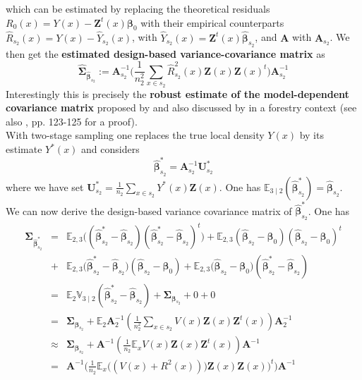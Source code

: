 \documentclass[a4paper,12pt,leqno, titlepage]{article}
\newcommand{\EX}{\mathbb{E}}
\newcommand{\VAR}{\mathbb{V}}
\begin{document}
which can be estimated by replacing the theoretical residuals $R_0(x)=Y(x)-\pmb{Z}^t(x)\pmb{\beta}_0$
with their empirical counterparts
$\hat{R}_{s_2}(x)=Y(x)-\hat{Y}_{s_2}(x)$, with $\hat{Y}_{s_2}(x)=\pmb{Z}^t(x)\hat{\pmb{\beta}}_{s_2}$, and $\pmb{A}$ with $\pmb{A}_{s_2}$. We then get the \textbf{estimated design-based
variance-covariance matrix} as
\begin{equation}\label{estvarmatrix}
\hat{\pmb{\Sigma}}_{\hat{\pmb{\beta}}_{s_2}}:=\pmb{A}_{s_2}^{-1}
\Big(\frac{1}{n_2^2}\sum_{x\in{s_2}}\hat{R}_{s_2}^2(x)\pmb{Z}(x)\pmb{Z}(x)^t\Big)\pmb{A}_{s_2}^{-1}
\end{equation}
Interestingly this is precisely the \textbf{robust estimate of the model-dependent covariance matrix} proposed by \cite{huber1} and also discussed by \cite{gregoire2} in a forestry context (see also \cite{mandallaz}, pp. 123-125 for a proof).\\
With two-stage sampling one replaces the true local density $Y(x)$ by its estimate $Y^*(x)$ and considers
\begin{equation}\label{beta2star}
\hat{\pmb{\beta}}^*_{s_2}=\pmb{A}_{s_2}^{-1}\pmb{U}^*_{s_2}
\end{equation}
where we have set $\pmb{U}^*_{s_2}=\frac{1}{n_2}\sum_{x\in{s_2}}Y^*(x)\pmb{Z}(x)$. One has $\EX_{3\mid 2}(\hat{\pmb{\beta}}^*_{s_2})=\hat{\pmb{\beta}}_{s_2}$.\\
 \noindent
We can now derive the design-based variance covariance matrix of $\hat{\pmb{\beta}}^*_{s_2}$. One has
\begin{eqnarray*}
\pmb{\Sigma}_{\hat{\pmb{\beta}}^*_{s_2}} &=& \EX_{2,3}\big((\hat{\pmb{\beta}}^*_{s_2}-\hat{\pmb{\beta}}_{s_2})(\hat{\pmb{\beta}}^*_{s_2}-\hat{\pmb{\beta}}_{s_2})^t\big)
+ \EX_{2,3}(\hat{\pmb{\beta}}_{s_2}-\pmb{\beta}_0)(\hat{\pmb{\beta}}_{s_2}-\pmb{\beta}_0)^t\\
&+& \EX_{2,3}\big(\hat{\pmb{\beta}}^*_{s_2}-\hat{\pmb{\beta}}_{s_2})(\hat{\pmb{\beta}}_{s_2}-\pmb{\beta}_0)
+ \EX_{2,3}\big(\hat{\pmb{\beta}}_{s_2}-\pmb{\beta}_0)(\hat{\pmb{\beta}}^*_{s_2}-\hat{\pmb{\beta}}_{s_2}) \\
&=&\EX_2\VAR_{3\mid 2}(\hat{\pmb{\beta}}^*_{s_2}-\hat{\pmb{\beta}}_{s_2})+ \pmb{\Sigma}_{\pmb{\beta}_{s_2}} + 0 +0 \\
&=& \pmb{\Sigma}_{\pmb{\beta}_{s_2}} + \EX_2 \pmb{A}_2^{-1}(\frac{1}{n_2^2}\sum_{x\in{s_2}}V(x)\pmb{Z}(x)\pmb{Z}^t(x))\pmb{A}_2^{-1}\\
&\approx & \pmb{\Sigma}_{\pmb{\beta}_{s_2}} + \pmb{A}^{-1}(\frac{1}{n_2}\EX_xV(x)\pmb{Z}(x)\pmb{Z}^t(x))\pmb{A}^{-1}\\
&=&\pmb{A}^{-1}\Big(\frac{1}{n_2}\EX_x\big((V(x)+R^2(x))\big)\pmb{Z}(x)\pmb{Z}(x)\big)^t\Big)\pmb{A}^{-1}
\end{eqnarray*}
\end{document}
